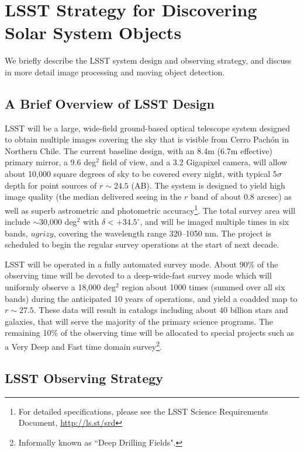 \section{LSST Strategy for Discovering Solar System Objects}

We briefly describe the LSST system design and observing strategy, and discuss in more
detail image processing and moving object detection.

\subsection{A Brief Overview of LSST  Design}

LSST will be a large, wide-field ground-based optical telescope system
designed to obtain multiple images covering the sky that is visible
from Cerro Pach\'{o}n in Northern Chile. The current baseline design,
with an 8.4m (6.7m effective) primary mirror, a 9.6 deg$^2$ field of
view, and a 3.2 Gigapixel camera, will allow about 10,000 square
degrees of sky to be covered every night, with typical 5$\sigma$ depth
for point sources of $r\sim24.5$ (AB). The system is designed to yield
high image quality (the median delivered seeing in the $r$ band of
about 0.8 arcsec) as well as superb astrometric  and photometric
accuracy\footnote{For detailed specifications, please see the LSST
Science Requirements Document, \url{http://ls.st/srd}}. The total survey
area will include $\sim$30,000 deg$^2$ with $\delta<+34.5^\circ$, and
will be imaged multiple times in six bands, $ugrizy$, covering the
wavelength range 320--1050 nm. The project is scheduled to  begin the
regular survey operations at the start of next decade.

LSST will be operated in a fully automated survey mode. About 90\% of the
observing time will be devoted to a deep-wide-fast survey mode which will
uniformly observe a 18,000 deg$^2$ region about 1000 times (summed over
all six bands) during the anticipated 10 years of operations, and yield a coadded map
to $r\sim27.5$. These data will result in catalogs including about
$40$ billion stars and galaxies, that will serve the majority of the
primary science programs. The remaining 10\% of the observing time
will be allocated to special projects such as a Very Deep and Fast
time domain survey\footnote{Informally known as ``Deep Drilling Fields".}.



\subsection{LSST Observing Strategy}

